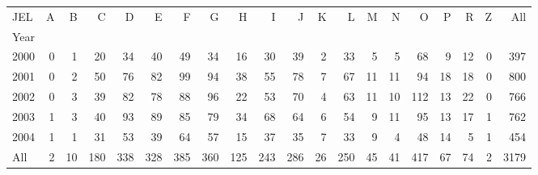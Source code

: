 \begin{tabular}{lrrrrrrrrrrrrrrrrrrr}
\toprule
JEL &  A &   B &    C &    D &    E &    F &    G &    H &    I &    J &   K &    L &   M &   N &    O &   P &   R &  Z &   All \\
Year &    &     &      &      &      &      &      &      &      &      &     &      &     &     &      &     &     &    &       \\
\midrule
2000 &  0 &   1 &   20 &   34 &   40 &   49 &   34 &   16 &   30 &   39 &   2 &   33 &   5 &   5 &   68 &   9 &  12 &  0 &   397 \\
2001 &  0 &   2 &   50 &   76 &   82 &   99 &   94 &   38 &   55 &   78 &   7 &   67 &  11 &  11 &   94 &  18 &  18 &  0 &   800 \\
2002 &  0 &   3 &   39 &   82 &   78 &   88 &   96 &   22 &   53 &   70 &   4 &   63 &  11 &  10 &  112 &  13 &  22 &  0 &   766 \\
2003 &  1 &   3 &   40 &   93 &   89 &   85 &   79 &   34 &   68 &   64 &   6 &   54 &   9 &  11 &   95 &  13 &  17 &  1 &   762 \\
2004 &  1 &   1 &   31 &   53 &   39 &   64 &   57 &   15 &   37 &   35 &   7 &   33 &   9 &   4 &   48 &  14 &   5 &  1 &   454 \\
All  &  2 &  10 &  180 &  338 &  328 &  385 &  360 &  125 &  243 &  286 &  26 &  250 &  45 &  41 &  417 &  67 &  74 &  2 &  3179 \\
\bottomrule
\end{tabular}
